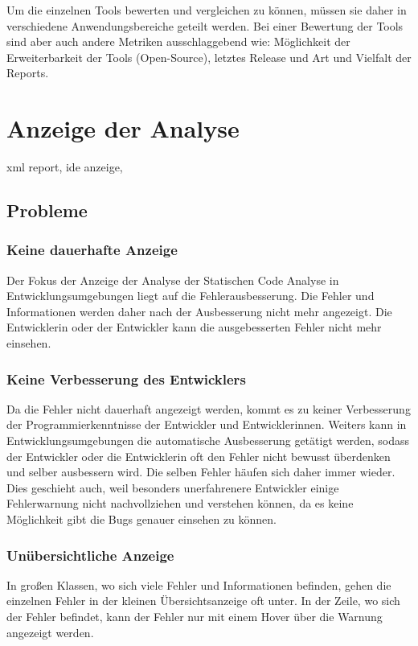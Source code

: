 Um die einzelnen Tools bewerten und vergleichen zu können, müssen sie daher in verschiedene Anwendungsbereiche geteilt werden. Bei einer Bewertung der Tools sind aber auch andere Metriken ausschlaggebend wie: Möglichkeit der Erweiterbarkeit der Tools (Open-Source), letztes Release und Art und Vielfalt der Reports.\cite{comparativeAnalysisTools}

\section{Anzeige der Analyse} 
xml report, ide anzeige, 
\subsection{Probleme} 

\subsubsection{Keine dauerhafte Anzeige} 
Der Fokus der Anzeige der Analyse der Statischen Code Analyse in Entwicklungsumgebungen liegt auf die Fehlerausbesserung. Die Fehler und Informationen werden daher nach der Ausbesserung nicht mehr angezeigt. Die Entwicklerin oder der Entwickler kann die ausgebesserten Fehler nicht mehr einsehen.

\subsubsection{Keine Verbesserung des Entwicklers} 
Da die Fehler nicht dauerhaft angezeigt werden, kommt es zu keiner Verbesserung der Programmierkenntnisse der Entwickler und Entwicklerinnen. Weiters kann in Entwicklungsumgebungen die automatische Ausbesserung getätigt werden, sodass der Entwickler oder die Entwicklerin oft den Fehler nicht bewusst überdenken und selber ausbessern wird. 
Die selben Fehler häufen sich daher immer wieder. Dies geschieht auch, weil besonders unerfahrenere Entwickler einige Fehlerwarnung nicht nachvollziehen und verstehen können, da es keine Möglichkeit gibt die Bugs genauer einsehen zu können. 

\subsubsection{Unübersichtliche Anzeige} 
In großen Klassen, wo sich viele Fehler und Informationen befinden, gehen die einzelnen Fehler in der kleinen Übersichtsanzeige oft unter. In der Zeile, wo sich der Fehler befindet, kann der Fehler nur mit einem Hover über die Warnung angezeigt werden. 